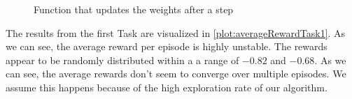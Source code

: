 \documentclass{article}
\begin{document}
	
	
	
	
	\begin{figure}[h]
		\caption{Function that updates the weights after a step}
		\label{code:updateWeights}
		
	\end{figure}
	
	
	\noindent The results from the first Task are visualized in \autoref{plot:averageRewardTask1}. As we can see, the average reward per episode is highly unstable. The rewards appear to be randomly distributed within a a range of $-0.82$ and $-0.68$. As we can see, the average rewards don't seem to converge over multiple episodes. We assume this happens because of the high exploration rate of our algorithm.
	
\end{document}
